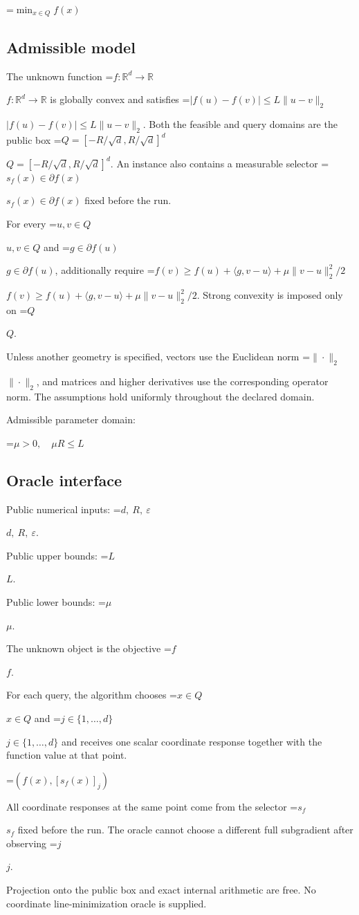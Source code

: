 \documentclass[10pt,a4paper]{article}
\newcommand{\AtlasMath}[1]{\par\begingroup\centering\setbox0=\hbox{$\displaystyle #1$}\ifdim\wd0>1.4\linewidth\typeout{ATLAS WIDE FORMULA: \the\wd0}\fi\ifdim\wd0>\linewidth\resizebox{\linewidth}{!}{\box0}\else\box0\fi\par\endgroup}
\newcommand{\AtlasInlineMath}[1]{\begingroup\setbox0=\hbox{$#1$}\ifdim\wd0>.4\linewidth\endgroup\AtlasMath{#1}\else\endgroup$#1$\fi}
\begin{document}
\AtlasMath{\min_{x\in Q}f(x)}


\subsection{Admissible model}
The unknown function \AtlasInlineMath{f:\mathbb R^d\to\mathbb R} is globally convex and satisfies \AtlasInlineMath{|f(u)-f(v)|\le L\|u-v\|_2}. Both the feasible and query domains are the public box \AtlasInlineMath{Q=[-R/\sqrt d,R/\sqrt d]^d}. An instance also contains a measurable selector \AtlasInlineMath{s_f(x)\in\partial f(x)} fixed before the run.

For every \AtlasInlineMath{u,v\in Q} and \AtlasInlineMath{g\in\partial f(u)}, additionally require \AtlasInlineMath{f(v)\ge f(u)+\langle g,v-u\rangle+\mu\|v-u\|_2^2/2}. Strong convexity is imposed only on \AtlasInlineMath{Q}.

Unless another geometry is specified, vectors use the Euclidean norm \AtlasInlineMath{\|\cdot\|_2}, and matrices and higher derivatives use the corresponding operator norm. The assumptions hold uniformly throughout the declared domain.

Admissible parameter domain:


\AtlasMath{\mu>0,\quad\mu R\le L}


\subsection{Oracle interface}
Public numerical inputs: \AtlasInlineMath{d,\ R,\ \varepsilon}.

Public upper bounds: \AtlasInlineMath{L}.

Public lower bounds: \AtlasInlineMath{\mu}.

The unknown object is the objective \AtlasInlineMath{f}.

For each query, the algorithm chooses \AtlasInlineMath{x\in Q} and \AtlasInlineMath{j\in\{1,\ldots,d\}} and receives one scalar coordinate response together with the function value at that point.


\AtlasMath{(f(x),[s_f(x)]_j)}


All coordinate responses at the same point come from the selector \AtlasInlineMath{s_f} fixed before the run. The oracle cannot choose a different full subgradient after observing \AtlasInlineMath{j}.

Projection onto the public box and exact internal arithmetic are free. No coordinate line-minimization oracle is supplied.
\end{document}

